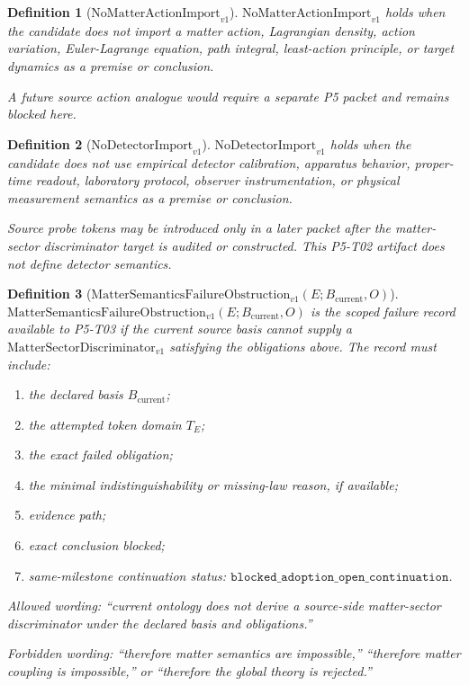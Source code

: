 \documentclass[11pt]{article}
\newcommand{\Bcur}{B_{\mathrm{current}}}
\newcommand{\Discriminator}{\mathrm{MatterSectorDiscriminator}_{v1}}
\newcommand{\NoAction}{\mathrm{NoMatterActionImport}_{v1}}
\newcommand{\NoDetector}{\mathrm{NoDetectorImport}_{v1}}
\newcommand{\FailureObs}{\mathrm{MatterSemanticsFailureObstruction}_{v1}}
\newtheorem{definition}{Definition}
\begin{document}
\begin{definition}[\(\NoAction\)]
\(\NoAction\) holds when the candidate does not import a matter action,
Lagrangian density, action variation, Euler-Lagrange equation, path integral,
least-action principle, or target dynamics as a premise or conclusion.

A future source action analogue would require a separate P5 packet and remains
blocked here.
\end{definition}

\begin{definition}[\(\NoDetector\)]
\(\NoDetector\) holds when the candidate does not use empirical detector
calibration, apparatus behavior, proper-time readout, laboratory protocol,
observer instrumentation, or physical measurement semantics as a premise or
conclusion.

Source probe tokens may be introduced only in a later packet after the
matter-sector discriminator target is audited or constructed. This P5-T02
artifact does not define detector semantics.
\end{definition}

\begin{definition}[\(\FailureObs(E;\Bcur,O)\)]
\(\FailureObs(E;\Bcur,O)\) is the scoped failure record available to P5-T03
if the current source basis cannot supply a \(\Discriminator\) satisfying the
obligations above. The record must include:
\begin{enumerate}[leftmargin=*]
\item the declared basis \(\Bcur\);
\item the attempted token domain \(T_E\);
\item the exact failed obligation;
\item the minimal indistinguishability or missing-law reason, if available;
\item evidence path;
\item exact conclusion blocked;
\item same-milestone continuation status:
  \(\mathtt{blocked\_adoption\_open\_continuation}\).
\end{enumerate}

Allowed wording: ``current ontology does not derive a source-side
matter-sector discriminator under the declared basis and obligations.''

Forbidden wording: ``therefore matter semantics are impossible,'' ``therefore
matter coupling is impossible,'' or ``therefore the global theory is
rejected.''
\end{definition}
\end{document}
